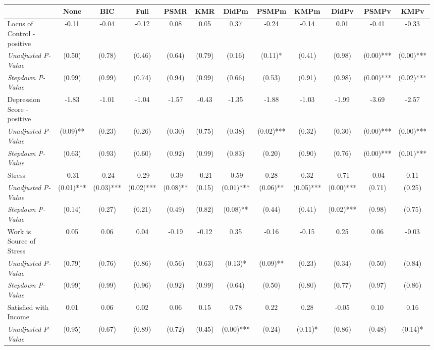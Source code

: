 \begin{tabular}{l c c c c c c c c c c c}
\toprule
 & None & BIC & Full & PSMR & KMR & DidPm & PSMPm & KMPm & DidPv & PSMPv & KMPv \\
\midrule
Locus of Control - positive & -0.11 & -0.04 & -0.12 & 0.08 & 0.05 & 0.37 & -0.24 & -0.14 & 0.01 & -0.41 & -0.33 \\
\quad \textit{Unadjusted P-Value} & (0.50) & (0.78) & (0.46) & (0.64) & (0.79) & (0.16) & (0.11)* & (0.41) & (0.98) & (0.00)*** & (0.00)*** \\
\quad \textit{Stepdown P-Value} & (0.99) & (0.99) & (0.74) & (0.94) & (0.99) & (0.66) & (0.53) & (0.91) & (0.98) & (0.00)*** & (0.02)*** \\
Depression Score - positive & -1.83 & -1.01 & -1.04 & -1.57 & -0.43 & -1.35 & -1.88 & -1.03 & -1.99 & -3.69 & -2.57 \\
\quad \textit{Unadjusted P-Value} & (0.09)** & (0.23) & (0.26) & (0.30) & (0.75) & (0.38) & (0.02)*** & (0.32) & (0.30) & (0.00)*** & (0.00)*** \\
\quad \textit{Stepdown P-Value} & (0.63) & (0.93) & (0.60) & (0.92) & (0.99) & (0.83) & (0.20) & (0.90) & (0.76) & (0.00)*** & (0.01)*** \\
Stress & -0.31 & -0.24 & -0.29 & -0.39 & -0.21 & -0.59 & 0.28 & 0.32 & -0.71 & -0.04 & 0.11 \\
\quad \textit{Unadjusted P-Value} & (0.01)*** & (0.03)*** & (0.02)*** & (0.08)** & (0.15) & (0.01)*** & (0.06)** & (0.05)*** & (0.00)*** & (0.71) & (0.25) \\
\quad \textit{Stepdown P-Value} & (0.14) & (0.27) & (0.21) & (0.49) & (0.82) & (0.08)** & (0.44) & (0.41) & (0.02)*** & (0.98) & (0.75) \\
Work is Source of Stress & 0.05 & 0.06 & 0.04 & -0.19 & -0.12 & 0.35 & -0.16 & -0.15 & 0.25 & 0.06 & -0.03 \\
\quad \textit{Unadjusted P-Value} & (0.79) & (0.76) & (0.86) & (0.56) & (0.63) & (0.13)* & (0.09)** & (0.23) & (0.34) & (0.50) & (0.84) \\
\quad \textit{Stepdown P-Value} & (0.99) & (0.99) & (0.96) & (0.92) & (0.99) & (0.64) & (0.50) & (0.80) & (0.77) & (0.97) & (0.86) \\
Satisfied with Income & 0.01 & 0.06 & 0.02 & 0.06 & 0.15 & 0.78 & 0.22 & 0.28 & -0.05 & 0.10 & 0.16 \\
\quad \textit{Unadjusted P-Value} & (0.95) & (0.67) & (0.89) & (0.72) & (0.45) & (0.00)*** & (0.24) & (0.11)* & (0.86) & (0.48) & (0.14)* \\

\end{tabular}

